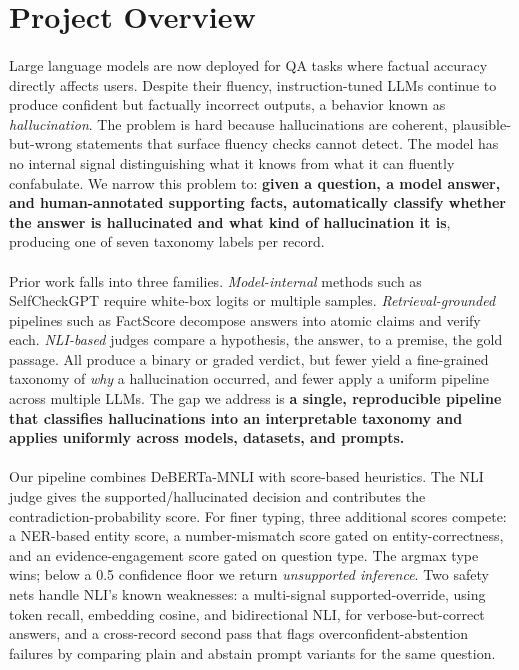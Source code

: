 \documentclass[11pt,a4paper]{article}
\newcommand{\lbl}[1]{\textit{#1}}
\begin{document}
\section{Project Overview}

\paragraph{} Large language models are now deployed for QA tasks where factual accuracy directly affects users. Despite their fluency, instruction-tuned LLMs continue to produce confident but factually incorrect outputs, a behavior known as \textit{hallucination}. The problem is hard because hallucinations are coherent, plausible-but-wrong statements that surface fluency checks cannot detect. The model has no internal signal distinguishing what it knows from what it can fluently confabulate. We narrow this problem to: \textbf{given a question, a model answer, and human-annotated supporting facts, automatically classify whether the answer is hallucinated and what kind of hallucination it is}, producing one of seven taxonomy labels per record.

\paragraph{} Prior work falls into three families. \textit{Model-internal} methods such as SelfCheckGPT require white-box logits or multiple samples. \textit{Retrieval-grounded} pipelines such as FactScore decompose answers into atomic claims and verify each. \textit{NLI-based} judges compare a hypothesis, the answer, to a premise, the gold passage. All produce a binary or graded verdict, but fewer yield a fine-grained taxonomy of \textit{why} a hallucination occurred, and fewer apply a uniform pipeline across multiple LLMs. The gap we address is \textbf{a single, reproducible pipeline that classifies hallucinations into an interpretable taxonomy and applies uniformly across models, datasets, and prompts.}

\paragraph{} Our pipeline combines DeBERTa-MNLI with score-based heuristics. The NLI judge gives the supported/hallucinated decision and contributes the contradiction-probability score. For finer typing, three additional scores compete: a NER-based entity score, a number-mismatch score gated on entity-correctness, and an evidence-engagement score gated on question type. The argmax type wins; below a 0.5 confidence floor we return \lbl{unsupported inference}. Two safety nets handle NLI's known weaknesses: a multi-signal supported-override, using token recall, embedding cosine, and bidirectional NLI, for verbose-but-correct answers, and a cross-record second pass that flags overconfident-abstention failures by comparing plain and abstain prompt variants for the same question.
\end{document}
